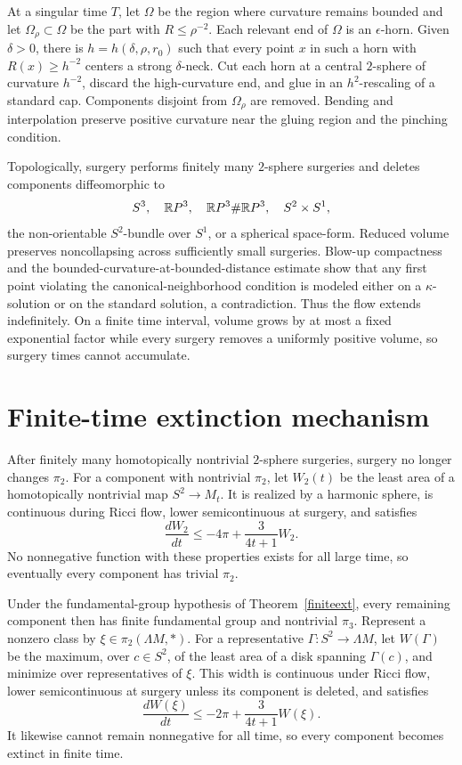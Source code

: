 At a singular time $T$, let $\Omega$ be the region where curvature remains
bounded and let $\Omega_\rho\subset\Omega$ be the part with
$R\leq\rho^{-2}$. Each relevant end of $\Omega$ is an $\epsilon$-horn. Given
$\delta>0$, there is $h=h(\delta,\rho,r_0)$ such that every point $x$ in such
a horn with $R(x)\geq h^{-2}$ centers a strong $\delta$-neck. Cut each horn at
a central $2$-sphere of curvature $h^{-2}$, discard the high-curvature end,
and glue in an $h^2$-rescaling of a standard cap. Components disjoint from
$\Omega_\rho$ are removed. Bending and interpolation preserve positive
curvature near the gluing region and the pinching condition.

Topologically, surgery performs finitely many $2$-sphere surgeries and deletes
components diffeomorphic to
\[
  S^3,\quad \mathbb{R} P^3,\quad \mathbb{R} P^3\#\mathbb{R} P^3,\quad S^2\times S^1,
\]
the non-orientable $S^2$-bundle over $S^1$, or a spherical space-form. Reduced
volume preserves noncollapsing across sufficiently small surgeries.
Blow-up compactness and the bounded-curvature-at-bounded-distance estimate
show that any first point violating the canonical-neighborhood condition is
modeled either on a $\kappa$-solution or on the standard solution, a
contradiction. Thus the flow extends indefinitely. On a finite time interval,
volume grows by at most a fixed exponential factor while every surgery removes
a uniformly positive volume, so surgery times cannot accumulate.

\section{Finite-time extinction mechanism}

After finitely many homotopically nontrivial $2$-sphere surgeries, surgery no
longer changes $\pi_2$. For a component with nontrivial $\pi_2$, let $W_2(t)$
be the least area of a homotopically nontrivial map $S^2\to M_t$. It is
realized by a harmonic sphere, is continuous during Ricci flow, lower
semicontinuous at surgery, and satisfies
\[
  \frac{dW_2}{dt}\leq-4\pi+\frac{3}{4t+1}W_2.
\]
No nonnegative function with these properties exists for all large time, so
eventually every component has trivial $\pi_2$.

Under the fundamental-group hypothesis of
Theorem~\ref{finiteext}, every remaining component then has finite fundamental
group and nontrivial $\pi_3$. Represent a nonzero class by
$\xi\in\pi_2(\Lambda M,*)$. For a representative
$\Gamma:S^2\to\Lambda M$, let $W(\Gamma)$ be the maximum, over
$c\in S^2$, of the least area of a disk spanning $\Gamma(c)$, and minimize
over representatives of $\xi$. This width is continuous under Ricci flow,
lower semicontinuous at surgery unless its component is deleted, and satisfies
\[
  \frac{dW(\xi)}{dt}\leq-2\pi+\frac{3}{4t+1}W(\xi).
\]
It likewise cannot remain nonnegative for all time, so every component becomes
extinct in finite time.
